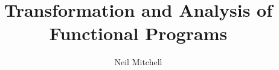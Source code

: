\author{Neil Mitchell}
\title{Transformation and Analysis of Functional Programs}

\maketitle

\tableofcontents
